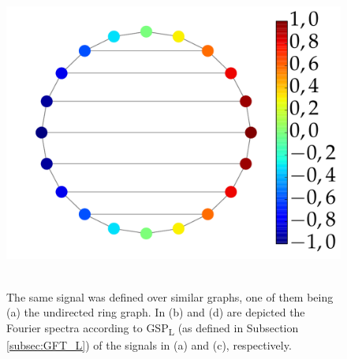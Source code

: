 \begin{figure}
\begin{minipage}[c]{0.24\linewidth}
{			\includegraphics[width=\linewidth]{Figures/ring_different_structure_02.pdf}
		}~
	\end{minipage}%
	\begin{minipage}[c]{0.25\linewidth}
	\end{minipage}%
	\caption{The same signal was defined over similar graphs, one of them being (a) the undirected ring graph. In (b) and (d) are depicted the Fourier spectra according to GSP\textsubscript{L} (as defined in Subsection \ref{subsec:GFT_L}) of the signals in (a) and (c), respectively.}%
	\label{fig:diff_struct}%
	\vspace{-0.2cm}
\end{figure}

